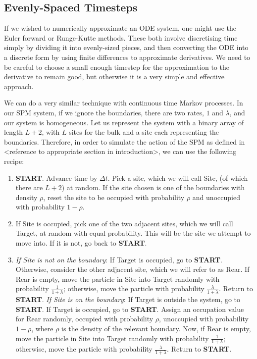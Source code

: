 \subsection{Evenly-Spaced Timesteps}

If we wished to numerically approximate an ODE system, one might use the Euler forward or 
Runge-Kutte methods. These both involve discretising time simply by dividing it into evenly-sized
pieces, and then converting the ODE into a discrete form by using finite differences to
approximate derivatives. We need to be careful to choose a small enough timestep for
the approximation to the derivative to remain good, but otherwise it is a very simple and 
effective approach.

We can do a very similar technique with continuous time Markov processes. In our SPM system,
if we ignore the boundaries, there are two rates, $1$ and $\lambda$, and our system is 
homogeneous. Let us represent the system with a binary array of length $L+2$, with $L$ sites for the bulk
and a site each representing the boundaries. Therefore, in order to simulate the action of the SPM as
defined in <reference to appropriate section in
introduction>, we can use the following recipe:
\begin{enumerate}
 \item \textbf{START}. Advance time by $\Delta t$. Pick a site, which we will call
 Site,
 (of which there are $L+2$) at random. If the site chosen is one of the boundaries with density $\rho$,
 reset the site to be occupied with probability $\rho$ and unoccupied with probability $1-\rho$.
 \item If Site is occupied, pick one of the two adjacent sites, which we will call Target, at random with equal probability.
 This will be the site we attempt to move into. If it is not, go back to \textbf{START}.
 \item \textit{If Site is not on the boundary}: If Target is occupied, go to \textbf{START}. Otherwise, consider the other adjacent site,
 which we will refer to as Rear. If Rear is empty, move the particle in Site into Target 
 randomly with
 probability $\frac{1}{1+\lambda}$; otherwise, move the particle with probability
 $\frac{\lambda}{1+\lambda}$. Return to \textbf{START}. 
 \newline \textit{If Site is on the boundary}: If Target is outside the system, go to \textbf{START}.
 If Target is occupied, go to \textbf{START}. Assign an occupation value for Rear randomly, occupied
 with probability $\rho$, unoccupied with probability $1-\rho$, where $\rho$ is the density of the relevant
 boundary. Now, if Rear is empty, move the particle in Site into Target 
 randomly with  probability $\frac{1}{1+\lambda}$; otherwise, move the particle with probability
 $\frac{\lambda}{1+\lambda}$. Return to \textbf{START}.
\end{enumerate}
